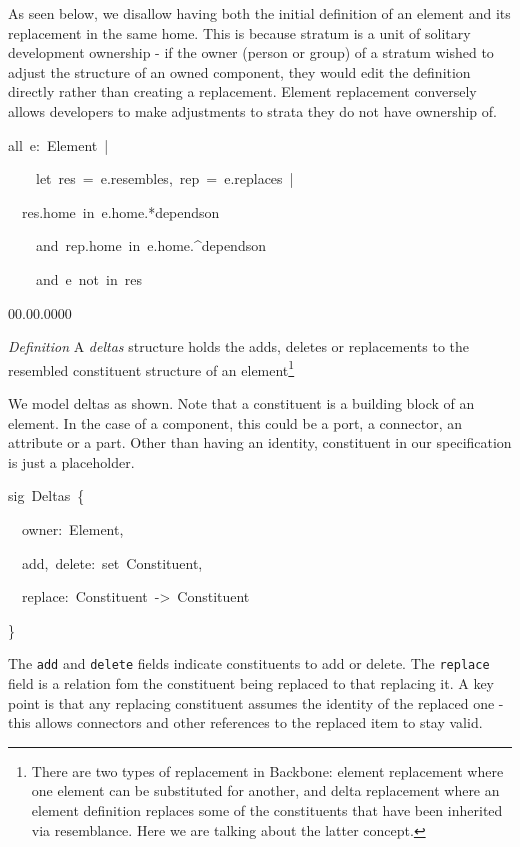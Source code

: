 As seen below, we disallow having both the initial definition of an
element and its replacement in the same home. This is because stratum
is a unit of solitary development ownership - if the owner (person
or group) of a stratum wished to adjust the structure of an owned
component, they would edit the definition directly rather than creating
a replacement. Element replacement conversely allows developers to
make adjustments to strata they do not have ownership of.
\begin{lyxcode}
{\footnotesize{}all~e:~Element~|}{\footnotesize \par}

{\footnotesize{}~~~~let~res~=~e.resembles,~rep~=~e.replaces~|}{\footnotesize \par}

{\footnotesize{}~~res.home~in~e.home.{*}dependson}{\footnotesize \par}

{\footnotesize{}~~~~and~rep.home~in~e.home.\textasciicircum{}dependson}{\footnotesize \par}

{\footnotesize{}~~~~and~e~not~in~res~}{\footnotesize \par}\end{lyxcode}
\begin{lyxlist}{00.00.0000}
\item [{\emph{Definition}}] A \emph{deltas} structure holds the adds, deletes
or replacements to the resembled constituent structure of an element\footnote{There are two types of replacement in Backbone: element replacement
where one element can be substituted for another, and delta replacement
where an element definition replaces some of the constituents that
have been inherited via resemblance. Here we are talking about the
latter concept.}
\end{lyxlist}
We model deltas as shown. Note that a constituent is a building block
of an element. In the case of a component, this could be a port, a
connector, an attribute or a part. Other than having an identity,
constituent in our specification is just a placeholder.
\begin{lyxcode}
{\footnotesize{}sig~Deltas~\{}{\footnotesize \par}

{\footnotesize{}~~owner:~Element,}{\footnotesize \par}

{\footnotesize{}~~add,~delete:~set~Constituent,}{\footnotesize \par}

{\footnotesize{}~~replace:~Constituent~->~Constituent}{\footnotesize \par}

{\footnotesize{}\}}{\footnotesize \par}
\end{lyxcode}
The \texttt{add} and \texttt{delete} fields indicate constituents
to add or delete. The \texttt{replace} field is a relation fom the
constituent being replaced to that replacing it. A key point is that
any replacing constituent assumes the identity of the replaced one
- this allows connectors and other references to the replaced item
to stay valid.

